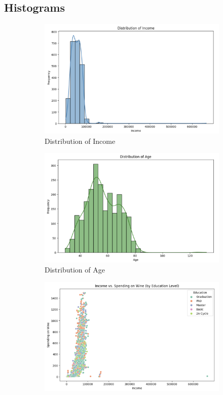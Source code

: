 \documentclass[a4paper]{article}
\begin{document}
\subsection{Histograms}
\begin{figure}[h]
    \centering
    \begin{subfigure}{0.3\textwidth}
        \includegraphics[width=\linewidth]{Distribution of Income.png}
        \caption{Distribution of Income}
        \label{fig:sub1}
    \end{subfigure}
    \hfill
    \begin{subfigure}{0.3\textwidth}
        \includegraphics[width=\linewidth]{Distribution of Age.png}
        \caption{Distribution of Age}
        \label{fig:sub2}
    \end{subfigure}
    \hfill
    \begin{subfigure}{0.3\textwidth}
        \includegraphics[width=\linewidth]{Income vs. Spending on Wine (by Education Level).png}

\end{subfigure}
\end{figure}
\end{document}
